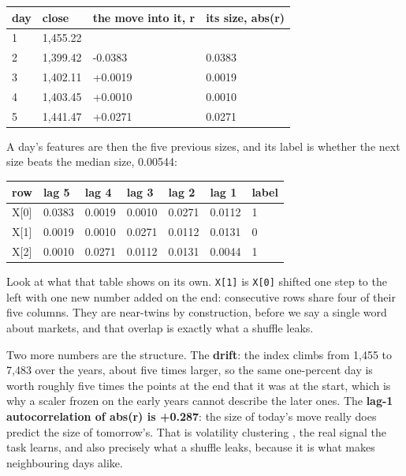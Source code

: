 \documentclass[11pt]{article} %
\begin{document}
\begin{center}
\begin{tabular}{llll}
\hline
day & close & the move into it, r & its size, abs(r) \\
\hline
1 & 1,455.22 &  &  \\
2 & 1,399.42 & -0.0383 & 0.0383 \\
3 & 1,402.11 & +0.0019 & 0.0019 \\
4 & 1,403.45 & +0.0010 & 0.0010 \\
5 & 1,441.47 & +0.0271 & 0.0271 \\
\hline
\end{tabular}
\end{center}


A day's features are then the five previous sizes, and its label is whether the next size beats the median size, 0.00544:

\begin{center}
\begin{tabular}{lllllll}
\hline
row & lag 5 & lag 4 & lag 3 & lag 2 & lag 1 & label \\
\hline
X[0] & 0.0383 & 0.0019 & 0.0010 & 0.0271 & 0.0112 & 1 \\
X[1] & 0.0019 & 0.0010 & 0.0271 & 0.0112 & 0.0131 & 0 \\
X[2] & 0.0010 & 0.0271 & 0.0112 & 0.0131 & 0.0044 & 1 \\
\hline
\end{tabular}
\end{center}


Look at what that table shows on its own. \texttt{X[1]} is \texttt{X[0]} shifted one step to the left with one new number added on the end: consecutive rows share four of their five columns. They are near-twins by construction, before we say a single word about markets, and that overlap is exactly what a shuffle leaks.

Two more numbers are the structure. The \textbf{drift}: the index climbs from 1,455 to 7,483 over the years, about five times larger, so the same one-percent day is worth roughly five times the points at the end that it was at the start, which is why a scaler frozen on the early years cannot describe the later ones. The \textbf{lag-1 autocorrelation of abs(r) is +0.287}: the size of today's move really does predict the size of tomorrow's. That is volatility clustering \cite{engle:1982}, the real signal the task learns, and also precisely what a shuffle leaks, because it is what makes neighbouring days alike.
\end{document}

